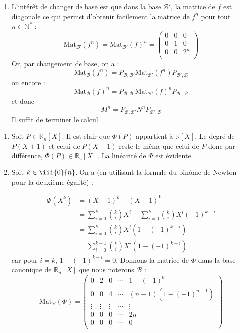 \documentclass[a4paper,twoside,french,11pt]{VcCours}
\begin{document}
\begin{enumerate}
\item L'intérêt de changer de base est que dans la base $\mathcal{B}'$, la matrice de $f$ est diagonale ce qui permet d'obtenir facilement la matrice de $f^n$ pour tout $n \in \mathbb{N}^*$ :
$$ \textrm{Mat}_{\mathcal{B}'}(f^n) = \textrm{Mat}_{\mathcal{B}'}(f)^n = \begin{pmatrix}
0 & 0 & 0 \\
0 & 1 & 0 \\
0 & 0 & 2^n \\
\end{pmatrix}$$
Or, par changement de base, on a :
$$  \textrm{Mat}_{\mathcal{B}}(f^n) = P_{\mathcal{B}, \mathcal{B}'} \textrm{Mat}_{\mathcal{B}'}(f^n) P_{\mathcal{B}', \mathcal{B}}$$
ou encore :
$$ \textrm{Mat}_{\mathcal{B}}(f) ^n= P_{\mathcal{B}, \mathcal{B}'} \textrm{Mat}_{\mathcal{B}'}(f)^n P_{\mathcal{B}', \mathcal{B}}$$
et donc 
$$ M^n=  P_{\mathcal{B}, \mathcal{B}'}N^n P_{\mathcal{B}', \mathcal{B}}$$
Il suffit de terminer le calcul.
\end{enumerate}




\begin{Exercice}{}\end{Exercice}

\begin{enumerate}
\item Soit $P \in \mathbb{R}_n[X]$. Il est clair que $\Phi(P)$ appartient à $\mathbb{R}[X]$. Le degré de $P(X+1)$ et celui de $P(X-1)$ reste le même que celui de $P$ donc par différence, $\Phi(P) \in \mathbb{R}_n[X]$. La linéarité de $\Phi$ est évidente.
\item Soit $k \in  \iii{0}{n}$. On a (en utilisant la formule du binôme de Newton pour la deuxième égalité) : 

\begin{align*}
\Phi(X^k) & = (X+1)^k - (X-1)^k \\
& = \sum_{i=0}^k \binom{k}{i} X^i - \sum_{i=0}^k \binom{k}{i} X^i (-1)^{k-i} \\
& =\sum_{i=0}^k \binom{k}{i} X^i  (1-(-1)^{k-i}) \\
& =\sum_{i=0}^{k-1} \binom{k}{i} X^i  (1-(-1)^{k-i}) 
\end{align*}
car pour $i=k$, $1-(-1)^{k-i}=0$. Donnons la matrice de $\Phi$ dans la base canonique de $\mathbb{R}_n[X]$ que nous noterons $\mathcal{B}$ :
$$ \textrm{Mat}_{\mathcal{B}}(\Phi) = \begin{pmatrix}
0 &   2 & 0 &  \cdots & 1-(-1)^n  \\
0 &  0  & 4 & \cdots &  (n-1) (1-(-1)^{n-1}) \\
\vdots & \vdots & \vdots & \cdots &  \vdots \\
0 &  0 & 0 &  \cdots & 2n  \\
0 &  0 & 0 &  \cdots& 0 \\
\end{pmatrix}$$

\end{enumerate}
\end{document}
